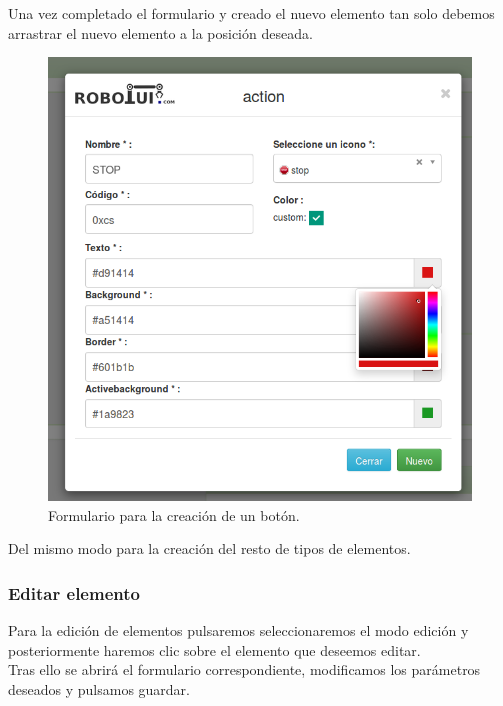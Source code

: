 Una vez completado el formulario y creado el nuevo elemento tan solo debemos arrastrar el nuevo elemento a la posición deseada.


\begin{figure}[H]
  \begin{center}
    \includegraphics[scale=.4]{imagenes/manual-usuario/formulario-action.png}
  \end{center}
  \caption{Formulario para la creación de un botón.}
  \label{website:pagina-principal}
\end{figure}

Del mismo modo para la creación del resto de tipos de elementos.

\subsubsection{Editar elemento}

Para la edición de elementos pulsaremos seleccionaremos el modo edición  y posteriormente haremos clic sobre el elemento que deseemos editar.\\

Tras ello se abrirá el formulario correspondiente, modificamos los parámetros deseados y pulsamos guardar.\\

